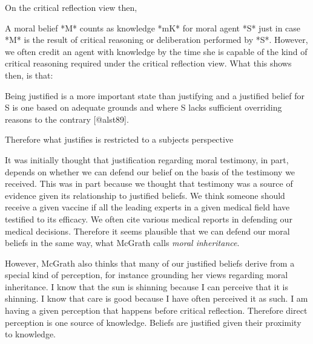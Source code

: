 \documentclass[12pt]{book}
\theoremstyle{definition}
\theoremstyle{remark}
\newcommand{\NormalTok}[1]{#1}
\newenvironment{Shaded}{}{}
\newenvironment{Highlighting}{}{}
\begin{document}
On the critical reflection view then,

\begin{Shaded}
\begin{Highlighting}[]

\NormalTok{A moral belief *M* counts as knowledge *mK* for moral agent *S* just in case *M* is the result of critical reasoning or deliberation performed by *S*. However, we often credit an agent with knowledge by the time she is capable of the kind of critical reasoning required under the critical reflection view. What this shows then, is that:}
\end{Highlighting}
\end{Shaded}

\begin{Shaded}
\begin{Highlighting}[]

\NormalTok{Being justified is a more important state than justifying and a justified belief for S is one based on adequate grounds and where S lacks sufficient overriding reasons to the contrary [@alst89].}
\end{Highlighting}
\end{Shaded}

\begin{Shaded}
\begin{Highlighting}[]

\NormalTok{Therefore what justifies is restricted to a subject\textquotesingle{}s perspective}
\end{Highlighting}
\end{Shaded}

It was initially thought that justification regarding moral testimony, in part, depends on whether we can defend our belief on the basis of the testimony we received. This was in part because we thought that testimony was a source of evidence given its relationship to justified beliefs. We think someone should receive a given vaccine if all the leading experts in a given medical field have testified to its efficacy. We often cite various medical reports in defending our medical decisions. Therefore it seems plausible that we can defend our moral beliefs in the same way, what McGrath calls \emph{moral inheritance}.

However, McGrath also thinks that many of our justified beliefs derive from a special kind of perception, for instance grounding her views regarding moral inheritance. I know that the sun is shinning because I can perceive that it is shinning. I know that care is good because I have often perceived it as such. I am having a given perception that happens before critical reflection. Therefore direct perception is one source of knowledge. Beliefs are justified given their proximity to knowledge.
\end{document}
